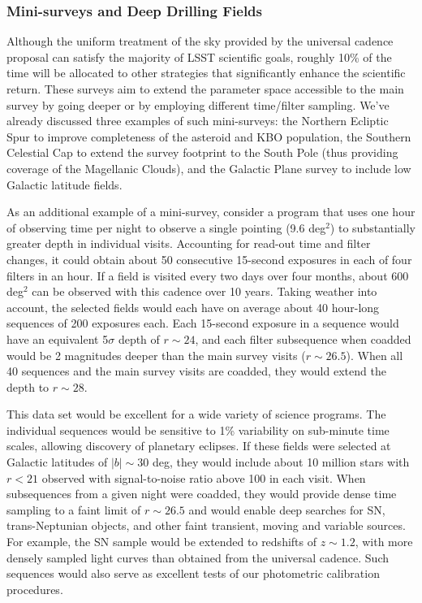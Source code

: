 \subsubsection{ Mini-surveys and Deep Drilling Fields}
\label{Sec:minisurveys}

Although the uniform treatment of the sky provided by the universal cadence
proposal can satisfy the majority of LSST scientific goals, roughly 10\%
of the time will be allocated to other strategies that significantly enhance the
scientific return.  These surveys aim to extend the parameter space accessible
to the main survey by going deeper or by employing different time/filter
sampling.  We've already discussed three examples of such
mini-surveys: the Northern Ecliptic Spur to improve completeness of
the asteroid and KBO population, the Southern Celestial Cap to extend
the survey footprint to the South Pole (thus providing coverage of the
Magellanic Clouds), and the Galactic Plane survey to include low
Galactic latitude fields.

As an additional  example of a mini-survey, consider a program that
uses one hour of
observing time per night to observe a single pointing (9.6 deg$^2$) to
substantially greater depth in individual visits. Accounting for
read-out time and filter changes, it could obtain about 50 consecutive
15-second exposures in each of four filters in an hour. If a field is visited
every two days over four months, about 600 deg$^2$ can be observed with this
cadence over 10 years. Taking weather into account, the selected fields would
each have on average about 40 hour-long sequences of 200 exposures each. Each
15-second exposure in a sequence would have an equivalent 5$\sigma$ depth of
$r\sim24$, and each filter subsequence when coadded would be 2 magnitudes
deeper than the main survey visits ($r\sim26.5$). When all 40 sequences and
the main survey visits are coadded, they would extend the depth to $r\sim28$.

This data set would be excellent for a wide variety of science programs. The
individual sequences would be sensitive to 1\% variability on sub-minute time
scales, allowing discovery of planetary eclipses. If these fields were selected
at Galactic latitudes of $|b|\sim30$ deg, they would include about 10 million
stars with $r<21$ observed with signal-to-noise ratio above 100 in each visit.
When subsequences from a given night were coadded, they would
provide dense time sampling to a faint limit of $r\sim26.5$
and would enable deep searches
for SN, trans-Neptunian objects, and other faint transient, moving and
variable sources.  For example, the SN sample
would be extended to redshifts of $z\sim1.2$, with more densely sampled light
curves than obtained from the universal cadence. Such sequences would also
serve as excellent tests of our photometric calibration procedures.

